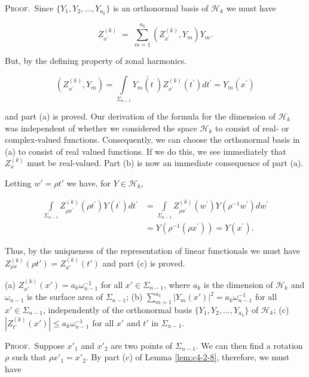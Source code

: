 \textsc{Proof.}\ Since $\{Y_1, Y_2, \ldots, Y_{a_k}\}$ is an orthonormal basis of $\mathcal{H}_k$ we must have

\[
Z_{x^{\prime}}^{(k)}\;=\;\sum_{m=1}^{a_{k}}\left(Z_{x^{\prime}}^{(k)},Y_{m}\right)Y_{m}.
\]

But, by the defining property of zonal harmonics.

\[
\left(Z_{x^{\prime}}^{(k)},Y_{m}\right)=\int\limits_{\Sigma_{n-1}}\overline{{Y_{m}(t^{^{\prime}})}}Z_{x^{\prime}}^{(k)}(t^{\prime})d t^{\prime}=\overline{{Y_{m}(x^{\prime})}}
\]

and part (a) is proved. Our derivation of the formula for the dimension of $\mathcal{H}_{k}$ was independent of whether we considered the space $\mathcal{H}_{k}$ to consist of real- or complex-valued functions. Consequently, we can choose the orthonormal basis in (a) to consist of real valued functions. If we do this, we see immediately that $Z_{x}^{(k)}$ must be real-valued. Part (b) is now an immediate consequence of part (a).

Letting $w' = \rho t'$ we have, for $Y \in \mathcal{H}_k$,

\[
\begin{aligned}\int\limits_{\Sigma_{n-1}}Z^{(k)}_{\rho x^{\prime}}(\rho t^{\prime})Y(t^{\prime})dt^{\prime}&=\int\limits_{\Sigma_{n-1}}Z^{(k)}_{\rho x^{\prime}}(w^{\prime})Y(\rho^{-1}w^{\prime})dw^{\prime}\\&=Y(\rho^{-1}(\rho x^{\prime}))=Y(x^{\prime}).\end{aligned}
\]

Thus, by the uniqueness of the representation of linear functionals we must have $Z_{\rho x}^{(k)}(\rho t') = Z_{x'}^{(k)}(t')$ and part (c) is proved.

\begin{corollary}
\label{cor:c4-2-9}
(a) $Z_{x'}^{(k)}(x') = a_{k} \omega_{n-1}^{-1}$ for all $x' \in \Sigma_{n-1}$, where $a_k$ is the dimension of $\mathcal{H}_k$ and $\omega_{n-1}$ is the surface area of $\Sigma_{n-1}$;
(b) $\sum_{m=1}^{a_k} |Y_m(x')|^2 = a_k \omega_{n-1}^{-1}$ for all $x' \in \Sigma_{n-1}$, independently of the orthonormal basis $\{Y_1, Y_2, \ldots, Y_{a_k}\}$ of $\mathcal{H}_k$;
(c) $|Z_{t'}^{(k)}(x')| \leq a_{k} \omega_{n-1}^{-1}$ for all $x'$ and $t'$ in $\Sigma_{n-1}$.
\end{corollary}

\textsc{Proof.}\ Suppose $x'_1$ and $x'_2$ are two points of $\Sigma_{n-1}$. We can then find a rotation $\rho$ such that $\rho x'_1 = x'_2$. By part (c) of Lemma \ref{lem:c4-2-8}, therefore, we must have

